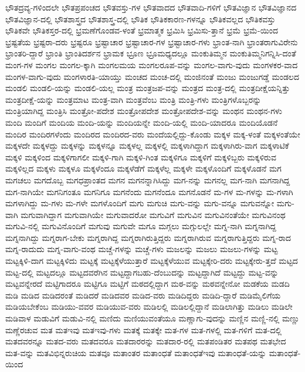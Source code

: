 {ಭೌತದ್ರವ್ಯ-ಗಳಿಂದಲೇ
ಭೌತಪ್ರಪಂಚದ
ಭೌತವಸ್ತು-ಗಳ
ಭೌತವಾದದ
ಭೌತವಾದಿ-ಗಳಿಗೆ
ಭೌತವಿಜ್ಞಾನ
ಭೌತವಿಜ್ಞಾನದ
ಭೌತವಿಜ್ಞಾನ-ದಲ್ಲಿ
ಭೌತಶಾಸ್ತ್ರದ
ಭೌತಶಾಸ್ತ್ರ-ದಲ್ಲಿ
ಭೌತಿಕ
ಭೌತಿಕಕಾರಣ-ಗಳನ್ನೂ
ಭೌತಿಕವಲ್ಲದ
ಭೌತಿಕವಸ್ತು
ಭೌತಿಕವೇ
ಭೌತಿಕಸ್ತರ-ದಲ್ಲಿ
ಭ್ರಮಣೆಗೊಂಡವ-ಳಂತೆ
ಭ್ರಮಾತ್ಮಕ
ಭ್ರಮಿಸಿ
ಭ್ರಮಿಸು-ತ್ತಾನೆ
ಭ್ರಮೆ
ಭ್ರಮೆ-ಯಿಂದ
ಭ್ರಷ್ಟತೆಯ
ಭ್ರಷ್ಟರಾ-ದರು
ಭ್ರಷ್ಟರೂ
ಭ್ರಷ್ಟಾಚಾರ
ಭ್ರಷ್ಟಾಚಾರ-ಗಳ
ಭ್ರಷ್ಟಾಚಾರ-ಗಳು
ಭ್ರಾಂತ-ನಾಗಿ
ಭ್ರಾಂತರಾಗುವಿರೇನು
ಭ್ರಾಂತರಿ-ದ್ದಾರೆ
ಭ್ರಾಂತಿ
ಭ್ರಾಂತಿದರ್ಶನ
ಭ್ರಾಮಕ
ಭ್ರೂಣ
ಭ್ರೂಮಧ್ಯದಲ್ಲೂ
ಮಂಕುತಿಮ್ಮನ
ಮಂಕುತಿಮ್ಮನಿಗನ್ನಿಸಿ-ದಂತೆ
ಮಂಗ-ಗಳ
ಮಂಗಲ
ಮಂಗಲ-ಕ್ಕಾಗಿ
ಮಂಗಲಮಯ
ಮಂಗಲರೂಪ-ವನ್ನು
ಮಂಗಲ-ವಾಗು-ವುದು
ಮಂಗಳಕರ-ವಾದ
ಮಂಗಳ-ವಾಗು-ವುದು
ಮಂಗಳಾರತಿ-ಯಾಯ್ತು
ಮಂಚದ
ಮಂಚ-ದಲ್ಲಿ
ಮಂಜಿನಂತೆ
ಮಂಜು
ಮಂಜುಗಡ್ಡೆ
ಮಂಡಲದ
ಮಂಡಲಿ
ಮಂಡಲಿ-ಯನ್ನು
ಮಂಡಲಿ-ಯಲ್ಲ
ಮಂತ್ರ
ಮಂತ್ರಜಪ-ವನ್ನು
ಮಂತ್ರದ
ಮಂತ್ರ-ದಲ್ಲಿ
ಮಂತ್ರದೀಕ್ಷೆಯನ್ನಿತ್ತು
ಮಂತ್ರದೀಕ್ಷೆ-ಯನ್ನು
ಮಂತ್ರಮಾಟ
ಮಂತ್ರ-ವಾಗಿ
ಮಂತ್ರವೆಂಬ
ಮಂತ್ರಿ
ಮಂತ್ರಿ-ಗಳು
ಮಂತ್ರಿಗಳೊಬ್ಬರನ್ನು
ಮಂತ್ರಿಯಾಗಿದ್ದ
ಮಂತ್ರಿಸಿ
ಮಂತ್ರೋ-ಪದೇಶ
ಮಂತ್ರೋಪದೇಶ
ಮಂತ್ರೋಪದೇಶ-ವನ್ನು
ಮಂಥನ
ಮಂಥನ-ಗಳು
ಮಂದಿ
ಮಂದಿಗೆ
ಮಂದಿಯ
ಮಂದಿ-ಯನ್ನು
ಮಂದಿಯನ್ನೇ
ಮಂದಿ-ಯಲ್ಲಿ
ಮಂದಿ-ಯಾದರೂ
ಮಂದಿಯೊಡನೆ
ಮಂದಿರ
ಮಂದಿರಗಳೆಂದು
ಮಂದಿರದ
ಮಂದಿರದ-ವರು
ಮಂದೆಯಲ್ಲಿದ್ದು-ಕೊಂಡು
ಮಕ್ಕಳ
ಮಕ್ಕ-ಳಂತೆ
ಮಕ್ಕಳಂತೆಯೇ
ಮಕ್ಕಳದೇ
ಮಕ್ಕಳದ್ದು
ಮಕ್ಕಳನ್ನು
ಮಕ್ಕಳನ್ನೂ
ಮಕ್ಕಳಲ್ಲ
ಮಕ್ಕಳಲ್ಲಿ
ಮಕ್ಕಳಾಗಿದ್ದಾಗ
ಮಕ್ಕಳಾಗಿರು-ವಾಗ
ಮಕ್ಕಳಾಟಿಕೆ
ಮಕ್ಕಳಿ
ಮಕ್ಕಳಿಂದ
ಮಕ್ಕಳಿಗಾಗಲೀ
ಮಕ್ಕಳಿ-ಗಾಗಿ
ಮಕ್ಕಳಿ-ಗಿಂತ
ಮಕ್ಕಳಿಗೂ
ಮಕ್ಕಳಿಗೆ
ಮಕ್ಕಳಿಬ್ಬರು
ಮಕ್ಕಳಿರುವ
ಮಕ್ಕಳಿಲ್ಲದ
ಮಕ್ಕಳು
ಮಕ್ಕಳೂ
ಮಕ್ಕಳೆಂದೂ
ಮಕ್ಕಳೆಡೆಗೆ
ಮಕ್ಕಳೆಲ್ಲ
ಮಕ್ಕಳೇ
ಮಕ್ಕಳೊಂದಿಗೆ
ಮಕ್ಕಳೊಡನೆ
ಮಗ
ಮಗಚಲು
ಮಗದೊಬ್ಬ
ಮಗಧಪ್ರಾಂತದ
ಮಗನ
ಮಗನನ್ನಾಗಿಸಿದ್ದು
ಮಗ-ನನ್ನು
ಮಗನಲ್ಲ
ಮಗ-ನಾಗಿ
ಮಗನಾಗಿದ್ದ
ಮಗ-ನಾಗಿಯೇ
ಮಗನಿಗಂತೂ
ಮಗನಿಗೂ
ಮಗನೆಂದು
ಮಗನೆಂದೂ
ಮಗನೊಡನೆ
ಮ-ಗಳ
ಮ-ಗಳನ್ನು
ಮ-ಗಳಾಗಿ
ಮಗಳಾಗಿದ್ದು
ಮ-ಗಳು
ಮ-ಗಳೇ
ಮಗಳೊಂದಿಗೆ
ಮಗು
ಮಗುಚಿ
ಮಗು-ವನ್ನು
ಮಗು-ವನ್ನೂ
ಮಗುವನ್ನೋ
ಮಗು-ವಾಗಿ
ಮಗುವಾಗಿದ್ದಾಗ
ಮಗುವಾಗಿಯೇ
ಮಗುವಾದರೋ
ಮಗುವಿಗೆ
ಮಗುವಿನ
ಮಗುವಿನಂತೆಯೇ
ಮಗುವಿನಂಥ
ಮಗುವಿ-ನಲ್ಲಿ
ಮಗುವಿನೊಂದಿಗೆ
ಮಗುವು
ಮಗುವೇ
ಮಗೂ
ಮಗ್ಗಲು
ಮಗ್ಗುಲಲ್ಲೇ
ಮಗ್ನ-ನಾಗಿ
ಮಗ್ನನಾಗಿದ್ದ
ಮಗ್ನನಾಗಿದ್ದು
ಮಗ್ನರಾಗ-ಬೇಕು
ಮಗ್ನರಾಗಿದ್ದ
ಮಗ್ನರಾಗಿರುತ್ತಿದ್ದರು
ಮಗ್ನರಾಗಿರುವ
ಮಗ್ನರಾಗುತ್ತಿದ್ದರು
ಮಗ್ನ-ರಾದ
ಮಗ್ನ-ರಾದುದು
ಮಗ್ನ-ವಾಗು-ವಂಥ
ಮಚ್ಚೆ-ಗಳನ್ನು
ಮಚ್ಚೆ-ಗಳು
ಮಜಲನ್ನು
ಮಜಲು
ಮಜಲು-ಗಳನ್ನು
ಮಟ್ಟ
ಮಟ್ಟಕ್ಕಿಳಿ-ದಾಗ
ಮಟ್ಟಕ್ಕಿಳಿದು
ಮಟ್ಟಕ್ಕೆ
ಮಟ್ಟಕ್ಕೆಳೆಯುತ್ತಾರೆ
ಮಟ್ಟಕ್ಕೆಳೆಯುವ
ಮಟ್ಟಕ್ಕೇರಿ-ದರು
ಮಟ್ಟಕ್ಕೇರು-ತ್ತದೆ
ಮಟ್ಟದ
ಮಟ್ಟ-ದಲ್ಲಿ
ಮಟ್ಟದಲ್ಲೂ
ಮಟ್ಟದವರೆಗಿನ
ಮಟ್ಟದ್ದಾಗಬಹು-ದೆಂಬುದನ್ನು
ಮಟ್ಟದ್ದಾಗಿದೆ
ಮಟ್ಟದ್ದು
ಮಟ್ಟ-ವನ್ನು
ಮಟ್ಟವನ್ನೇರದೆ
ಮಟ್ಟಿಗಾದರೂ
ಮಟ್ಟಿಗೂ
ಮಟ್ಟಿಗೆ
ಮಠದಲ್ಲಿದ್ದಾಗ
ಮಠ-ವನ್ನು
ಮಠವನ್ನೇನೋ
ಮಡಕೆಯ
ಮಡದಿ
ಮಡಿ
ಮಡಿದ
ಮಡಿದರಂತೆ
ಮಡಿದರೆ
ಮಡಿದವರ
ಮಡಿದ-ವರು
ಮಡಿದಿದ್ದರು
ಮಡಿದಿ-ದ್ದಾರೆ
ಮಡಿಮೈಲಿಗೆಯ
ಮಡಿಯಬೇಕೆಂಬ
ಮಡಿಯು-ವವರ
ಮಡಿಯುವ-ವರು
ಮಡಿಲಲ್ಲಿ
ಮಡಿಲಲ್ಲಿದ್ದಾನೆ
ಮಡಿಲಾಗಿತ್ತು
ಮಡಿಲು
ಮಡಿಲೇ
ಮಡಿವಾಳ
ಮಡುವಿಗೆ
ಮಡುವಿ-ನಲ್ಲಿ
ಮಣಿದು
ಮಣಿಯುವಂತೆಯೂ
ಮಣ್ಣಾಗು-ವುದನ್ನು
ಮಣ್ಣಿನ
ಮಣ್ಣಿ-ನಲ್ಲಿ
ಮಣ್ಣು
ಮಣ್ಣೆರಚುವ
ಮತ
ಮತಇವು
ಮತಇವು-ಗಳು
ಮತಕ್ಕೆ
ಮತಕ್ಕೇ
ಮತ-ಗಳ
ಮತ-ಗಳಲ್ಲಿ
ಮತ-ಗಳಿಗೆ
ಮತ-ದಲ್ಲಿ
ಮತದವರನ್ನೂ
ಮತದ-ವರು
ಮತದವರೂ
ಮತದಾರರನ್ನು
ಮತದಾರ-ರಲ್ಲಿ
ಮತಪಂಡಿತರ
ಮತಪಥ
ಮತಭೇದ
ಮತ-ವನ್ನು
ಮತವಿಭಿನ್ನರುಚಿಯ
ಮತವೂ
ಮತಾಂತರ
ಮತಾಂಧತೆ
ಮತಾಂಧತೆಇವು
ಮತಾಂಧತೆ-ಯನ್ನು
ಮತಾಂಧತೆ-ಯಿಂದ
}
